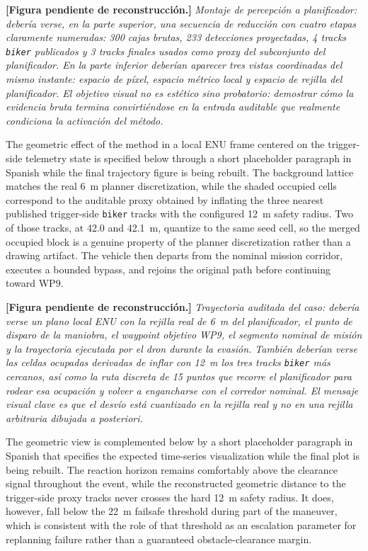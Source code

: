 \documentclass[a4paper,11pt]{article}
\newcommand{\diagramplaceholder}[1]{\par\smallskip\noindent\textbf{[Figura pendiente de reconstrucción.] } \emph{#1}\par\smallskip}
\begin{document}
\diagramplaceholder{Montaje de percepción a planificador: debería verse, en la parte superior, una secuencia de reducción con cuatro etapas claramente numeradas: 300 cajas brutas, 233 detecciones proyectadas, 4 tracks \texttt{biker} publicados y 3 tracks finales usados como proxy del subconjunto del planificador. En la parte inferior deberían aparecer tres vistas coordinadas del mismo instante: espacio de píxel, espacio métrico local y espacio de rejilla del planificador. El objetivo visual no es estético sino probatorio: demostrar cómo la evidencia bruta termina convirtiéndose en la entrada auditable que realmente condiciona la activación del método.}

The geometric effect of the method in a local ENU frame centered on the trigger-side telemetry state is specified below through a short placeholder paragraph in Spanish while the final trajectory figure is being rebuilt. The background lattice matches the real \SI{6}{\meter} planner discretization, while the shaded occupied cells correspond to the auditable proxy obtained by inflating the three nearest published trigger-side \texttt{biker} tracks with the configured \SI{12}{\meter} safety radius. Two of those tracks, at 42.0 and \SI{42.1}{\meter}, quantize to the same seed cell, so the merged occupied block is a genuine property of the planner discretization rather than a drawing artifact. The vehicle then departs from the nominal mission corridor, executes a bounded bypass, and rejoins the original path before continuing toward WP9.

\diagramplaceholder{Trayectoria auditada del caso: debería verse un plano local ENU con la rejilla real de \SI{6}{\meter} del planificador, el punto de disparo de la maniobra, el waypoint objetivo WP9, el segmento nominal de misión y la trayectoria ejecutada por el dron durante la evasión. También deberían verse las celdas ocupadas derivadas de inflar con \SI{12}{\meter} los tres tracks \texttt{biker} más cercanos, así como la ruta discreta de 15 puntos que recorre el planificador para rodear esa ocupación y volver a engancharse con el corredor nominal. El mensaje visual clave es que el desvío está cuantizado en la rejilla real y no en una rejilla arbitraria dibujada a posteriori.}

The geometric view is complemented below by a short placeholder paragraph in Spanish that specifies the expected time-series visualization while the final plot is being rebuilt. The reaction horizon remains comfortably above the clearance signal throughout the event, while the reconstructed geometric distance to the trigger-side proxy tracks never crosses the hard \SI{12}{\meter} safety radius. It does, however, fall below the \SI{22}{\meter} failsafe threshold during part of the maneuver, which is consistent with the role of that threshold as an escalation parameter for replanning failure rather than a guaranteed obstacle-clearance margin.
\end{document}
